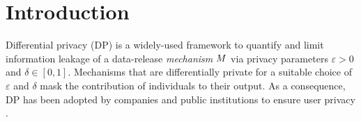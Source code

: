 \section{Introduction}



Differential privacy (DP) \cite{Dwork2006} is a widely-used framework to quantify and limit information leakage of a data-release {\em mechanism} $M$ via privacy parameters $\varepsilon > 0$ and $\delta \in [0,1]$. Mechanisms that are differentially private for a suitable choice of $\varepsilon$ and $\delta$ mask the contribution of individuals to their output. As a consequence, DP has been adopted by companies and public institutions to ensure user privacy \cite{Erlingsson2014,Holohan2019,Abowd2018}.






